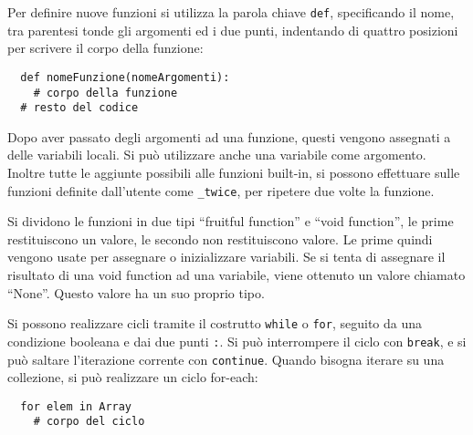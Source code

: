 \documentclass{article}
\numberwithin{equation}{subsection}
\begin{document}
Per definire nuove funzioni si utilizza la parola chiave \verb|def|, specificando il nome, tra parentesi tonde gli argomenti ed i due punti, indentando di quattro posizioni 
per scrivere il corpo della funzione:
\begin{verbatim}
  def nomeFunzione(nomeArgomenti):
    # corpo della funzione
  # resto del codice
\end{verbatim}

Dopo aver passato degli argomenti ad una funzione, questi vengono assegnati a delle variabili locali. Si può utilizzare anche una variabile come argomento. Inoltre 
tutte le aggiunte possibili alle funzioni built-in, si possono effettuare sulle funzioni definite dall'utente come \verb|_twice|, per ripetere due volte la funzione. 

Si dividono le funzioni in due tipi ``fruitful function'' e ``void function'',  le prime restituiscono un valore, le secondo non restituiscono valore. Le prime quindi 
vengono usate per assegnare o inizializzare variabili. Se si tenta di assegnare il risultato di una void function ad una variabile, viene ottenuto un valore chiamato ``None''. 
Questo valore ha un suo proprio tipo. 

Si possono realizzare cicli tramite il costrutto \verb|while| o \verb|for|, seguito da una condizione booleana e dai due punti \verb|:|. 
Si può interrompere il ciclo con \verb|break|, e si può saltare l'iterazione corrente con \verb|continue|. Quando bisogna iterare su una collezione, si può realizzare 
un ciclo for-each:
\begin{verbatim}
  for elem in Array
    # corpo del ciclo
\end{verbatim}
\end{document}
